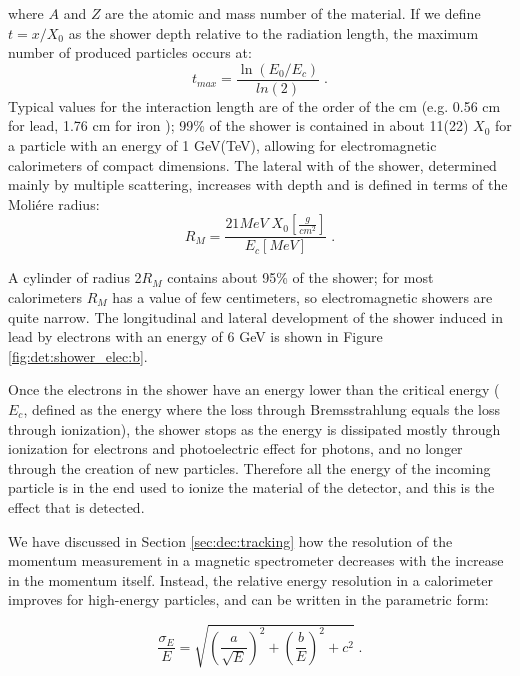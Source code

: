 \noindent where $A$ and $Z$ are the atomic and mass number of the material. If we define $t = x/X_0$ as the shower depth relative to the radiation length, the maximum number of produced particles occurs at:
\begin{equation}
t_{max} = \frac{\ln\left(E_0/E_c\right)}{ln\left(2\right)} \;.
\end{equation}
Typical values for the interaction length are of the order of the cm (e.g. 0.56 cm for lead, 1.76 cm for iron \cite{Patrignani:2016xqp}); 99\% of the shower is contained in about 11(22) $X_0$ for a particle with an energy of 1 GeV(TeV), 
allowing for electromagnetic calorimeters of compact dimensions. 
The lateral with of the shower, determined mainly by multiple scattering, increases with depth and is defined in terms of the Moli\'ere radius:
\begin{equation}
R_M = \frac{21 MeV \; X_0[\frac{g}{cm^2}]}{E_c [MeV]} \; .
\end{equation}

\noindent A cylinder of radius 2$R_M$ contains about 95\% of the shower; for most calorimeters $R_M$ has a value of few centimeters, so electromagnetic showers are quite narrow. The longitudinal and lateral development of the shower induced in lead by electrons with an energy of 6 GeV is shown in Figure \ref{fig:det:shower_elec:b}.

Once the electrons in the shower have an energy lower than the critical energy 
($E_c$, defined as the energy where the loss through Bremsstrahlung equals the loss through ionization), 
the shower stops as the energy is dissipated mostly through ionization for electrons and photoelectric effect for photons, 
and no longer through the creation of new particles. 
Therefore all the energy of the incoming particle is in the end used to ionize the material of the detector, and this is the effect that is detected.


We have discussed in Section \ref{sec:dec:tracking} how the resolution of the momentum measurement in a magnetic spectrometer decreases with the increase in the momentum itself. Instead, the relative energy resolution in a calorimeter improves for high-energy particles, and can be written in the parametric form:

\begin{equation}
\frac{\sigma_E}{E} = \sqrt{\left(\frac{a}{\sqrt{E}} \right)^2 + \left( \frac{b}{E} \right)^2 + c^2 } \; .
\end{equation}

